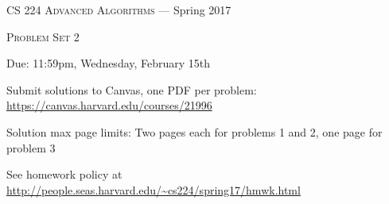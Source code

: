 \documentclass[12pt]{article}
\begin{document}
\thispagestyle{empty}

\begin{center}
{\Large \textsc{CS 224 Advanced Algorithms} --- Spring 2017}

\bigskip

{\Large \textsc{Problem Set 2}}

\smallskip

Due: 11:59pm, Wednesday, February 15th

\medskip

Submit solutions to Canvas, one PDF per problem: \url{https://canvas.harvard.edu/courses/21996}

\medskip

Solution max page limits: Two pages each for problems 1 and 2, one page for problem 3

\bigskip

{\footnotesize See homework policy at \url{http://people.seas.harvard.edu/~cs224/spring17/hmwk.html}}
\end{center}
\end{document}
